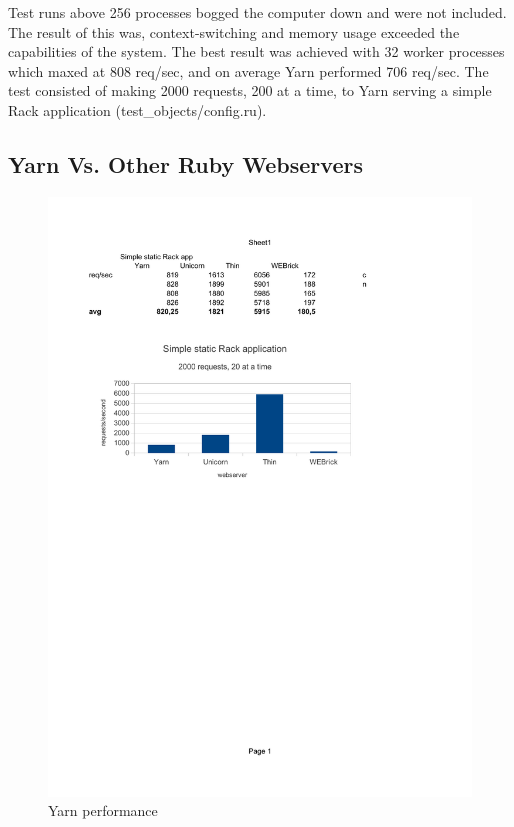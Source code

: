 Test runs above 256 processes bogged the computer down and were not included.
The result of this was, context-switching and memory usage exceeded the
capabilities of the system. The best result was achieved with 32 worker
processes which maxed at 808 req/sec, and on average Yarn performed 706 req/sec. The
test consisted of making 2000 requests, 200 at a time, to Yarn serving a
simple Rack application (test\_objects/config.ru).

\subsection{Yarn Vs. Other Ruby Webservers}

\begin{figure}[htb]
  \centering
  \includegraphics[width=1.0\textwidth]{benchmark/static.pdf}
  \caption{Yarn performance}
  \label{optwork}
\end{figure}


